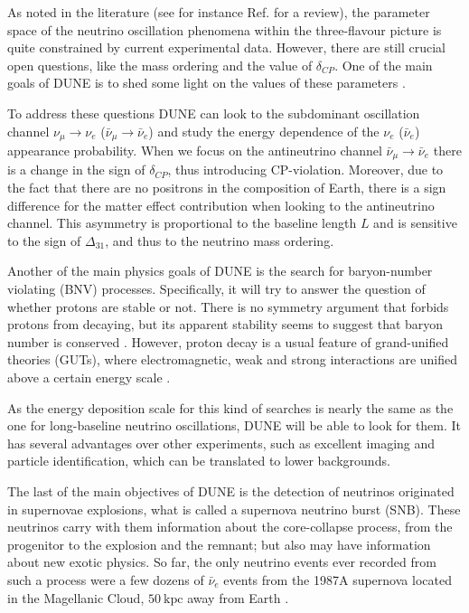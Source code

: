 As noted in the literature (see for instance Ref. \cite{deSalas2020} for a review), the parameter space of the neutrino oscillation phenomena within the three-flavour picture is quite constrained by current experimental data. However, there are still crucial open questions, like the mass ordering and the value of $\delta_{CP}$. One of the main goals of DUNE is to shed some light on the values of these parameters \cite{DUNE2020TDR2}.

To address these questions DUNE can look to the subdominant oscillation channel $\nu_{\mu} \rightarrow \nu_{e}$ ($\bar{\nu}_{\mu} \rightarrow \bar{\nu}_{e}$) and study the energy dependence of the $\nu_{e}$ ($\bar{\nu}_{e}$) appearance probability. When we focus on the antineutrino channel $\bar{\nu}_{\mu} \rightarrow \bar{\nu}_{e}$ there is a change in the sign of $\delta_{CP}$, thus introducing CP-violation. Moreover, due to the fact that there are no positrons in the composition of Earth, there is a sign difference for the matter effect contribution when looking to the antineutrino channel. This asymmetry is proportional to the baseline length $L$ and is sensitive to the sign of $\Delta_{31}$, and thus to the neutrino mass ordering.

Another of the main physics goals of DUNE is the search for baryon-number violating (BNV) processes. Specifically, it will try to answer the question of whether protons are stable or not. There is no symmetry argument that forbids protons from decaying, but its apparent stability seems to suggest that baryon number is conserved \cite{Super-Kamiokande2009}. However, proton decay is a usual feature of grand-unified theories (GUTs), where electromagnetic, weak and strong interactions are unified above a certain energy scale \cite{Raby2006}.

As the energy deposition scale for this kind of searches is nearly the same as the one for long-baseline neutrino oscillations, DUNE will be able to look for them. It has several advantages over other experiments, such as excellent imaging and particle identification, which can be translated to lower backgrounds.

The last of the main objectives of DUNE is the detection of neutrinos originated in supernovae explosions, what is called a supernova neutrino burst (SNB). These neutrinos carry with them information about the core-collapse process, from the progenitor to the explosion and the remnant; but also may have information about new exotic physics. So far, the only neutrino events ever recorded from such a process were a few dozens of $\bar{\nu}_{e}$ events from the 1987A supernova located in the Magellanic Cloud, $50 \ \mathrm{kpc}$ away from Earth \cite{Kamiokande-II1987, Bionta1987}.

